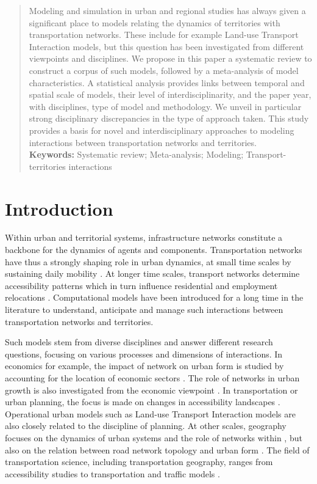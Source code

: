 \documentclass[10pt]{article}
\begin{document}
\begin{abstract}
Modeling and simulation in urban and regional studies has always given a significant place to models relating the dynamics of territories with transportation networks. These include for example Land-use Transport Interaction models, but this question has been investigated from different viewpoints and disciplines. We propose in this paper a systematic review to construct a corpus of such models, followed by a meta-analysis of model characteristics. A statistical analysis provides links between temporal and spatial scale of models, their level of interdisciplinarity, and the paper year, with disciplines, type of model and methodology. We unveil in particular strong disciplinary discrepancies in the type of approach taken. This study provides a basis for novel and interdisciplinary approaches to modeling interactions between transportation networks and territories.
\medskip\\
\textbf{Keywords: } Systematic review; Meta-analysis; Modeling; Transport-territories interactions
\end{abstract}


\section{Introduction}


Within urban and territorial systems, infrastructure networks constitute a backbone for the dynamics of agents and components. Transportation networks have thus a strongly shaping role in urban dynamics, at small time scales by sustaining daily mobility \cite{zhong2015measuring}. At longer time scales, transport networks determine accessibility patterns which in turn influence residential and employment relocations \cite{wegener2004land}. Computational models have been introduced for a long time in the literature to understand, anticipate and manage such interactions between transportation networks and territories.

Such models stem from diverse disciplines and answer different research questions, focusing on various processes and dimensions of interactions. In economics for example, the impact of network on urban form is studied by accounting for the location of economic sectors \cite{baum2017roads}. The role of networks in urban growth is also investigated from the economic viewpoint \cite{baum2020does}. In transportation or urban planning, the focus is made on changes in accessibility landscapes \cite{santos2010interurban}. Operational urban models such as Land-use Transport Interaction models \cite{wegener2004land} are also closely related to the discipline of planning. At other scales, geography focuses on the dynamics of urban systems and the role of networks within \cite{pumain2017urban}, but also on the relation between road network topology and urban form \cite{raimbault2019urban}. The field of transportation science, including transportation geography, ranges from accessibility studies \cite{geurs2004accessibility} to transportation and traffic models \cite{mcnally2007four}.
\end{document}
